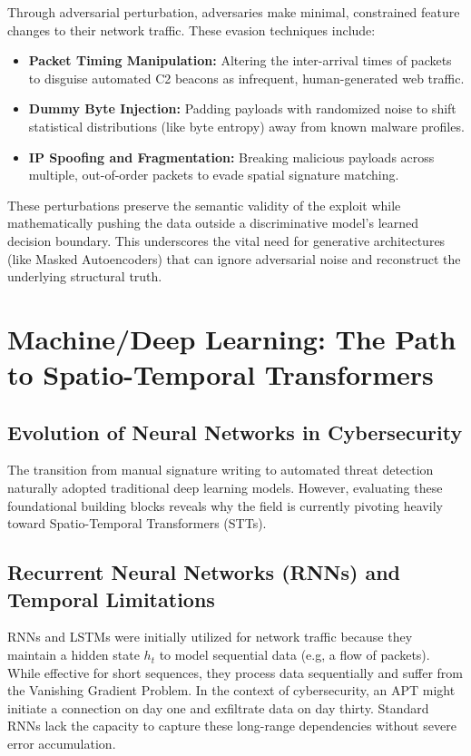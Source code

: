\documentclass[12pt, a4paper]{report}
\begin{document}
Through adversarial perturbation, adversaries make minimal, constrained feature changes to their network traffic. These evasion techniques include:
\begin{itemize}
    \item \textbf{Packet Timing Manipulation:} Altering the inter-arrival times of packets to disguise automated C2 beacons as infrequent, human-generated web traffic.
    \item \textbf{Dummy Byte Injection:} Padding payloads with randomized noise to shift statistical distributions (like byte entropy) away from known malware profiles.
    \item \textbf{IP Spoofing and Fragmentation:} Breaking malicious payloads across multiple, out-of-order packets to evade spatial signature matching.
\end{itemize}
These perturbations preserve the semantic validity of the exploit while mathematically pushing the data outside a discriminative model's learned decision boundary. This underscores the vital need for generative architectures (like Masked Autoencoders) that can ignore adversarial noise and reconstruct the underlying structural truth.



\chapter{Machine/Deep Learning: The Path to Spatio-Temporal Transformers}

\section{Evolution of Neural Networks in Cybersecurity}
The transition from manual signature writing to automated threat detection naturally adopted traditional deep learning models. However, evaluating these foundational building blocks reveals why the field is currently pivoting heavily toward Spatio-Temporal Transformers (STTs).

\section{Recurrent Neural Networks (RNNs) and Temporal Limitations}
RNNs and LSTMs were initially utilized for network traffic because they maintain a hidden state $h_t$ to model sequential data (e.g, a flow of packets). While effective for short sequences, they process data sequentially and suffer from the Vanishing Gradient Problem. In the context of cybersecurity, an APT might initiate a connection on day one and exfiltrate data on day thirty. Standard RNNs lack the capacity to capture these long-range dependencies without severe error accumulation.
\end{document}
